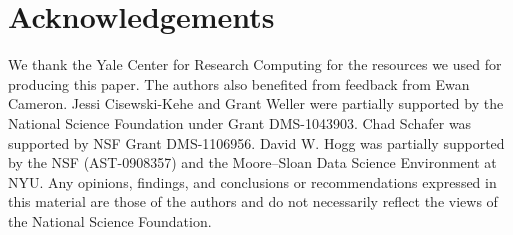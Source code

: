 \documentclass[12pt]{article}
\begin{document}
%
%
%
%

\section*{Acknowledgements}
We thank the Yale Center for Research Computing for the resources we used for producing this paper.
The authors also benefited from feedback from Ewan Cameron.  
Jessi Cisewski-Kehe and Grant Weller were partially supported by the National Science Foundation under Grant DMS-1043903. 
Chad Schafer was supported by NSF Grant DMS-1106956.  David W. Hogg was partially supported by the NSF (AST-0908357) and the Moore--Sloan Data Science Environment at NYU.
Any opinions, findings, and conclusions or recommendations expressed in this material are those of the authors and do not necessarily reflect the views of the National Science Foundation.








\end{document}
